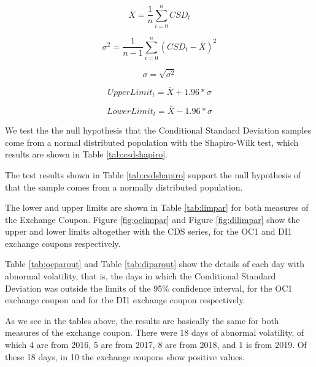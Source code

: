 \documentclass[cic,tc, english]{iiufrgs}
\begin{document}
    $$\bar{X} = \frac{1}{n} \displaystyle\sum_{i=0}^{n} CSD_t$$

    $$\sigma^2 = \frac{1}{n-1} \displaystyle\sum_{i=0}^{n} (CSD_t - \bar{X})^2$$

    $$\sigma = \sqrt{\sigma^2}$$

    \begin{equation}
        \label{eqn:upp}
        UpperLimit_t = \bar{X} + 1.96 * \sigma
    \end{equation}

    \begin{equation}
        \label{eqn:lop}
        LowerLimit_t = \bar{X} - 1.96 * \sigma
    \end{equation}

    We test the the null hypothesis that the Conditional Standard Deviation samples come from a normal distributed population with the Shapiro-Wilk test, which results are shown in Table \ref{tab:csdshapiro}.

    

    The test results shown in Table \ref{tab:csdshapiro} support the null hypothesis of that the sample comes from a normally distributed population.

    The lower and upper limits are shown in Table \ref{tab:limpar} for both measures of the Exchange Coupon. Figure \ref{fig:oclimpar} and Figure \ref{fig:dilimpar} show the upper and lower limits altogether with the CDS series, for the OC1 and DI1 exchange coupons respectively.

    

    

    

    Table \ref{tab:ocparout} and Table \ref{tab:diparout} show the details of each day with abnormal volatility, that is, the days in which the Conditional Standard Deviation was outside the limits of the 95\% confidence interval, for the OC1 exchange coupon and for the DI1 exchange coupon respectively.

    

    

    As we see in the tables above, the results are basically the same for both measures of the exchange coupon. There were 18 days of abnormal volatility, of which 4 are from 2016, 5 are from 2017, 8 are from 2018, and 1 is from 2019. Of these 18 days, in 10 the exchange coupons show positive values.
\end{document}
